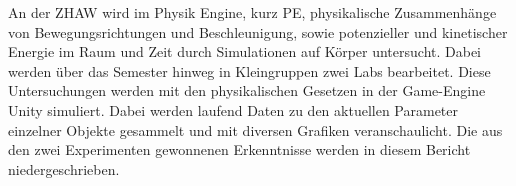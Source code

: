 \documentclass[../main.tex]{subfiles}
\begin{document}
An der ZHAW wird im Physik Engine, kurz PE, physikalische Zusammenhänge
von Bewegungsrichtungen und Beschleunigung, sowie potenzieller und kinetischer Energie im Raum und Zeit
durch Simulationen auf Körper untersucht. Dabei werden über das Semester hinweg in Kleingruppen
zwei Labs bearbeitet.
\newline
\newline
Diese Untersuchungen werden mit den physikalischen Gesetzen in der Game-Engine Unity simuliert.
Dabei werden laufend Daten zu den aktuellen Parameter einzelner Objekte gesammelt und mit diversen
Grafiken veranschaulicht. Die aus den zwei Experimenten gewonnenen Erkenntnisse werden in diesem Bericht
niedergeschrieben.
\newline
\newline
\end{document}
